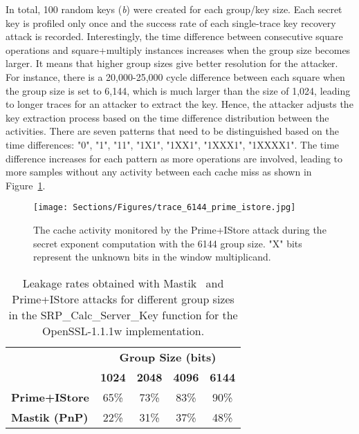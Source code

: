 In total, 100 random keys (\textit{b}) were created for each group/key size. Each secret key is profiled only once and the success rate of each single-trace key recovery attack is recorded. Interestingly, the time difference between consecutive square operations and square+multiply instances increases when the group size becomes larger. It means that higher group sizes give better resolution for the attacker. For instance, there is a 20,000-25,000 cycle difference between each square when the group size is set to 6,144, which is much larger than the size of 1,024, leading to longer traces for an attacker to extract the key. Hence, the attacker adjusts the key extraction process based on the time difference distribution between the activities. There are seven patterns that need to be distinguished based on the time differences: "0", "1", "11", "1X1", "1XX1", "1XXX1", "1XXXX1". The time difference increases for each pattern as more operations are involved, leading to more samples without any activity between each cache miss as shown in Figure~\ref{fig:SRP}.

\begin{figure}[t]
    \centering
    \texttt{[image: Sections/Figures/trace\_6144\_prime\_istore.jpg]}
    
    \caption{The cache activity monitored by the Prime+IStore attack during the secret exponent computation with the 6144 group size. "X" bits represent the unknown bits in the window multiplicand.}
    \label{fig:SRP}
    
\end{figure}

\begin{table}[h]
\small
\centering
\caption{Leakage rates obtained with Mastik~\cite{yarom2016mastik} and Prime+IStore attacks for different group sizes in the SRP\_Calc\_Server\_Key function for the OpenSSL-1.1.1w implementation.}
\setlength{\tabcolsep}{5pt}
\begin{tabular}{l|c|c|c|c|}
\cline{2-5}
& \multicolumn{4}{c|}{\textbf{Group Size (bits)}} \\
\cline{2-5}
& \textbf{1024} & \textbf{2048} & \textbf{4096} & \textbf{6144} \\\hline\hline
\multicolumn{1}{|l|}{\textbf{Prime+IStore}} & 65\% & 73\% & 83\% & 90\% \\\hline
\multicolumn{1}{|l|}{\textbf{Mastik (PnP)}} & 22\% & 31\% &  37\% & 48\%  \\\hline
\end{tabular}
\label{tab:SRP_leak}
\end{table}

